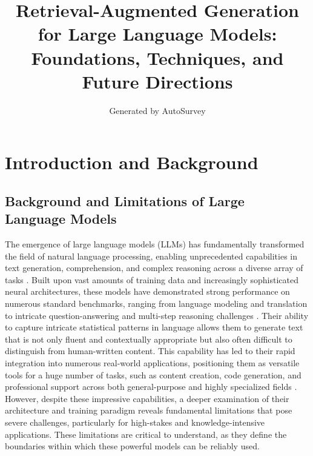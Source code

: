 \documentclass[11pt]{article}
\title{Retrieval-Augmented Generation for Large Language Models: Foundations, Techniques, and Future Directions}
\author{Generated by AutoSurvey}
\date{}
\begin{document}
\maketitle
\tableofcontents
\newpage

\section{Introduction and Background}

\subsection{Background and Limitations of Large Language Models}

The emergence of large language models (LLMs) has fundamentally transformed the field of natural language processing, enabling unprecedented capabilities in text generation, comprehension, and complex reasoning across a diverse array of tasks \cite{ref1,ref2}. Built upon vast amounts of training data and increasingly sophisticated neural architectures, these models have demonstrated strong performance on numerous standard benchmarks, ranging from language modeling and translation to intricate question-answering and multi-step reasoning challenges \cite{ref3,ref4}. Their ability to capture intricate statistical patterns in language allows them to generate text that is not only fluent and contextually appropriate but also often difficult to distinguish from human-written content. This capability has led to their rapid integration into numerous real-world applications, positioning them as versatile tools for a huge number of tasks, such as content creation, code generation, and professional support across both general-purpose and highly specialized fields \cite{ref5}. However, despite these impressive capabilities, a deeper examination of their architecture and training paradigm reveals fundamental limitations that pose severe challenges, particularly for high-stakes and knowledge-intensive applications. These limitations are critical to understand, as they define the boundaries within which these powerful models can be reliably used.
\end{document}
